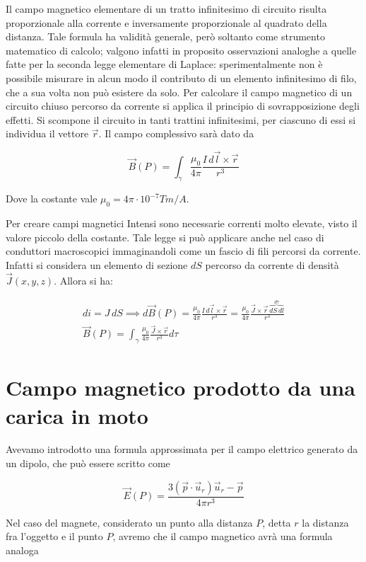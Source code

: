 Il campo magnetico elementare di un tratto infinitesimo di circuito risulta proporzionale alla corrente e inversamente proporzionale al quadrato della distanza. Tale formula ha validità generale, però soltanto come strumento matematico di calcolo; valgono infatti in proposito osservazioni analoghe a quelle fatte per la seconda legge elementare di Laplace: sperimentalmente non è possibile misurare in alcun modo il contributo di un elemento infinitesimo di filo, che a sua volta non può esistere da solo.
Per calcolare il campo magnetico di un circuito chiuso percorso da corrente si applica il principio di sovrapposizione degli effetti. Si scompone il circuito in tanti trattini infinitesimi, per ciascuno di essi si individua il vettore $\vec{r}$. Il campo complessivo sarà dato da

\[
	\vec{B} (P) = \int_{\gamma} \frac{\mu_0}{4\pi}\frac{I\,d\vec{l} \times \vec{r}}{r^3}
\]

Dove la costante vale $ \mu_0 = 4\pi \cdot 10^{-7} Tm/A $.

Per creare campi magnetici Intensi sono necessarie correnti molto elevate, visto il valore piccolo della costante.
Tale legge si può applicare anche nel caso di conduttori macroscopici immaginandoli come un fascio di fili percorsi da corrente. Infatti si considera un elemento di sezione $dS$ percorso da corrente di densità $\vec{J}(x,y,z)$. Allora si ha:

\begin{gather*}
	di=J\,dS \implies d\vec{B} (P)=\frac{\mu_0}{4\pi}\frac{I\,d\vec{l} \times \vec{r}}{r^3} = \frac{\mu_0}{4\pi} \frac{\vec{J} \times \vec{r} \,\overbrace{dS\,dl}^{d\tau}}{r^3} \\
	\boxed{\vec{B} (P)= \int_{\gamma}\frac{\mu_0}{4\pi}\frac{\vec{J} \times \vec{r}}{r^3}d\tau}
\end{gather*}

\section{Campo magnetico prodotto da una carica in moto}

Avevamo introdotto una formula approssimata per il campo elettrico generato da un dipolo, che può essere scritto come

\[
	\vec{E} (P)= \frac{3(\vec{p} \cdot \vec{u}_r)\vec{u}_r-\vec{p}}{4\pi r^3}
\]

Nel caso del magnete, considerato un punto alla distanza $P$, detta $r$ la distanza fra l'oggetto e il punto $P$, avremo che il campo magnetico avrà una formula analoga

